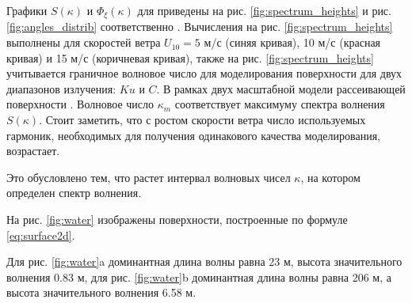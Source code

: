 Графики $S(\kappa)$ и  $\Phi_\xi(\kappa)$ для приведены на рис.
\ref{fig:spectrum_heights} и рис. \ref{fig:angles_distrib} соответственно
\cite{spectrum}. 
Вычисления на рис. \ref{fig:spectrum_heights} выполнены для скоростей ветра 
$U_{10} = 5$ м/с (синяя кривая), 10 м/с (красная кривая) и 15 м/с (коричневая
кривая), также на  рис. \ref{fig:spectrum_heights} учитывается граничное волновое число
для моделирования поверхности для двух диапазонов излучения: $Ku$ и $C$. В
рамках двух масштабной модели  рассеивающей поверхности \cite{bass-and_fuks}.
Волновое число $\kappa_m$ соответствует  максимуму спектра волнения  $S(\kappa)$. Стоит
заметить, что с ростом скорости ветра число используемых гармоник, необходимых
для получения одинакового качества моделирования,
возрастает. 

Это обусловлено тем, что растет интервал волновых чисел $\kappa$, на котором
определен спектр волнения. 

На рис. \ref{fig:water} изображены поверхности,
построенные по формуле \eqref{eq:surface2d}.

Для рис. \ref{fig:water}a доминантная длина волны равна 23 м, высота
значительного волнения 0.83 м, для рис. \ref{fig:water}b доминантная длина
волны равна 206 м, а высота значительного волнения 6.58 м.

